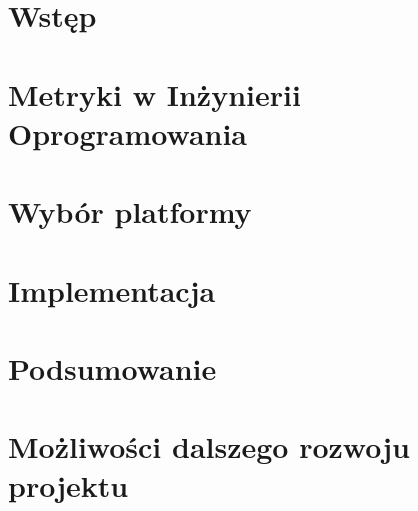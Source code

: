 \chapter*{Wstęp}




\chapter{Metryki w Inżynierii Oprogramowania}






\chapter{Wybór platformy}


\chapter{Implementacja}



\chapter{Podsumowanie}


\chapter{Możliwości dalszego rozwoju projektu}

